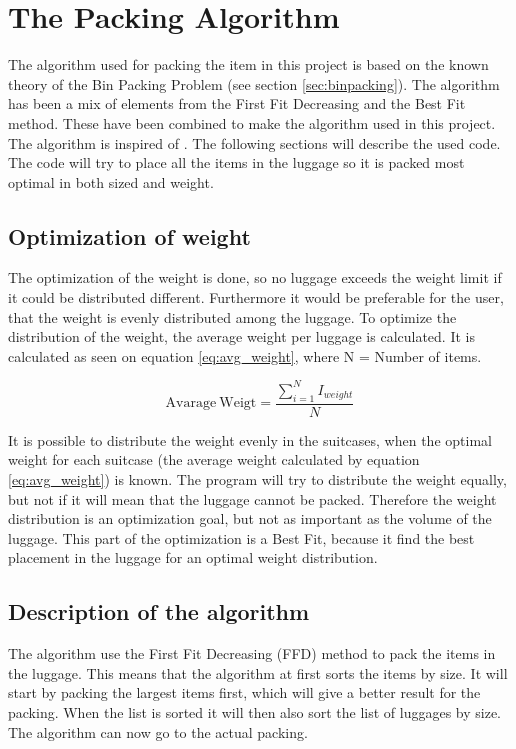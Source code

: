 \section{The Packing Algorithm}
\label{sec:algorithm}
The algorithm used for packing the item in this project is based on the known theory of the Bin Packing Problem (see section \ref{sec:binpacking}). The algorithm has been a mix of elements from the First Fit Decreasing and the Best Fit method. These have been combined to make the algorithm used in this project. The algorithm is inspired of \citet{three-dim-pack}. The following sections will describe the used code.
The code will try to place all the items in the luggage so it is packed most optimal in both sized and weight.

\subsection{Optimization of weight}
The optimization of the weight is done, so no luggage exceeds the weight limit if it could be distributed different. Furthermore it would be preferable for the user, that the weight is evenly distributed among the luggage.
To optimize the distribution of the weight, the average weight per luggage is calculated. It is calculated as seen on equation \ref{eq:avg_weight}, where N = Number of items.

\begin{equation}
	\label{eq:avg_weight}
	\mathrm{Avarage~Weigt} = \frac{\displaystyle\sum_{i=1}^{N} I_{weight}}{N}
\end{equation}

It is possible to distribute the weight evenly in the suitcases, when the optimal weight for each suitcase (the average weight calculated by equation \ref{eq:avg_weight}) is known. The program will try to distribute the weight equally, but not if it will mean that the luggage cannot be packed. Therefore the weight distribution is an optimization goal, but not as important as the volume of the luggage. This part of the optimization is a Best Fit, because it find the best placement in the luggage for an optimal weight distribution.

\subsection{Description of the algorithm}
The algorithm use the First Fit Decreasing (FFD) method to pack the items in the luggage. This means that the algorithm at first sorts the items by size. It will start by packing the largest items first, which will give a better result for the packing. When the list is sorted it will then also sort the list of luggages by size. The algorithm can now go to the actual packing.

